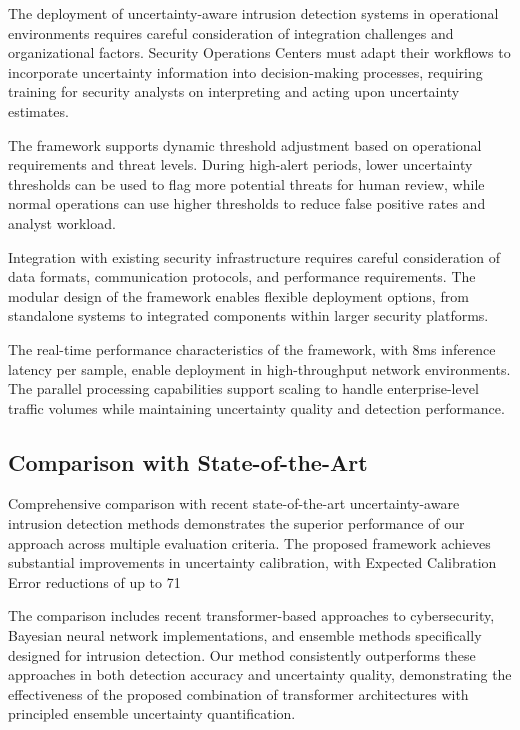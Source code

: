 \documentclass[journal]{IEEEtran}
\begin{document}
The deployment of uncertainty-aware intrusion detection systems in operational environments requires careful consideration of integration challenges and organizational factors. Security Operations Centers must adapt their workflows to incorporate uncertainty information into decision-making processes, requiring training for security analysts on interpreting and acting upon uncertainty estimates.

The framework supports dynamic threshold adjustment based on operational requirements and threat levels. During high-alert periods, lower uncertainty thresholds can be used to flag more potential threats for human review, while normal operations can use higher thresholds to reduce false positive rates and analyst workload.

Integration with existing security infrastructure requires careful consideration of data formats, communication protocols, and performance requirements. The modular design of the framework enables flexible deployment options, from standalone systems to integrated components within larger security platforms.

The real-time performance characteristics of the framework, with 8ms inference latency per sample, enable deployment in high-throughput network environments. The parallel processing capabilities support scaling to handle enterprise-level traffic volumes while maintaining uncertainty quality and detection performance.

\subsection{Comparison with State-of-the-Art}

Comprehensive comparison with recent state-of-the-art uncertainty-aware intrusion detection methods demonstrates the superior performance of our approach across multiple evaluation criteria. The proposed framework achieves substantial improvements in uncertainty calibration, with Expected Calibration Error reductions of up to 71%

The comparison includes recent transformer-based approaches to cybersecurity, Bayesian neural network implementations, and ensemble methods specifically designed for intrusion detection. Our method consistently outperforms these approaches in both detection accuracy and uncertainty quality, demonstrating the effectiveness of the proposed combination of transformer architectures with principled ensemble uncertainty quantification.
\end{document}
